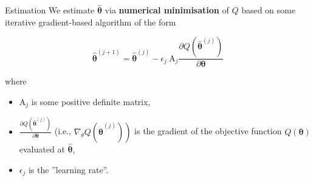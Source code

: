 \documentclass{beamer}
\begin{document}
\begin{frame}{Estimation}
We estimate $\hat{\boldsymbol{\theta}}$ via \textbf{numerical minimisation} of $Q$ based on some iterative gradient-based algorithm of the form

$$
\hat{\boldsymbol{\theta}}^{(j+1)}=\hat{\boldsymbol{\theta}}^{(j)}-\epsilon_{j} \mathrm{~A}_{j} \frac{\partial Q\left(\hat{\boldsymbol{\theta}}^{(j)}\right)}{\partial \boldsymbol{\theta}}
$$

where
\begin{itemize}
\item $\mathrm{A}_{j}$ is some positive definite matrix,

\item $\frac{\partial Q\left(\hat{\boldsymbol{\theta}}^{(j)}\right)}{\partial \boldsymbol{\theta}}$ (i.e., $\left.\nabla_{\theta} Q\left(\hat{\boldsymbol{\theta}}^{(j)}\right)\right)$ is the gradient of the objective function $Q(\boldsymbol{\theta})$ evaluated at $\hat{\boldsymbol{\theta}}$,

\item $\epsilon_{j}$ is the ''learning rate''. 
\end{itemize}
\end{frame}
\end{document}
